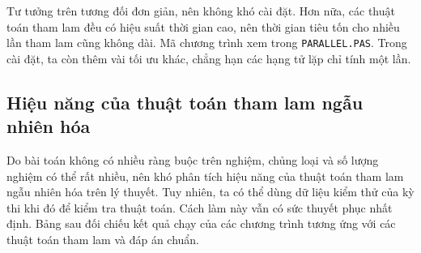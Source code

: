 \documentclass[11pt]{article}
\begin{document}
Tư tưởng trên tương đối đơn giản, nên không khó cài đặt. Hơn nữa, các thuật
toán tham lam đều có hiệu suất thời gian cao, nên thời gian tiêu tốn cho nhiều
lần tham lam cũng không dài. Mã chương trình xem trong \texttt{PARALLEL.PAS}.
Trong cài đặt, ta còn thêm vài tối ưu khác, chẳng hạn các hạng tử lặp chỉ tính
một lần.

\subsection{Hiệu năng của thuật toán tham lam ngẫu nhiên hóa}

Do bài toán không có nhiều ràng buộc trên nghiệm, chủng loại và số lượng nghiệm
có thể rất nhiều, nên khó phân tích hiệu năng của thuật toán tham lam ngẫu
nhiên hóa trên lý thuyết. Tuy nhiên, ta có thể dùng dữ liệu kiểm thử của kỳ
thi khi đó để kiểm tra thuật toán. Cách làm này vẫn có sức thuyết phục nhất
định. Bảng sau đối chiếu kết quả chạy của các chương trình tương ứng với các
thuật toán tham lam và đáp án chuẩn.
\end{document}

